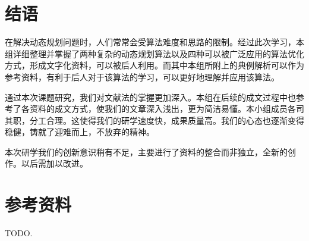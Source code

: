 \begin{Shaded}
\begin{Highlighting}[]
\OperatorTok{(}\OperatorTok{,}\OperatorTok{,}\OperatorTok{(}\OperatorTok{));}\OperatorTok{[}\OperatorTok{]=}\OperatorTok{;}
\OperatorTok{(}\OperatorTok{,}\OperatorTok{);}
\OperatorTok{\textless{}\textless{}}\OperatorTok{[}\OperatorTok{]\textless{}\textless{}}\CharTok{\textquotesingle{}}\CharTok{\textquotesingle{}}\OperatorTok{;}
     \OperatorTok{;}
\OperatorTok{\}}
\end{Highlighting}
\end{Shaded}

\section{结语}

在解决动态规划问题时，人们常常会受算法难度和思路的限制。经过此次学习，本组详细整理并掌握了两种复杂的动态规划算法以及四种可以被广泛应用的算法优化方式，形成文字化资料，可以被后人利用。而其中本组所附上的典例解析可以作为参考资料，有利于后人对于该算法的学习，可以更好地理解并应用该算法。

通过本次课题研究，我们对文献法的掌握更加深入。本组在后续的成文过程中也参考了各资料的成文方式，使我们的文章深入浅出，更为简洁易懂。本小组成员各司其职，分工合理。这使得我们的研学速度快，成果质量高。我们的心态也逐渐变得稳健，铸就了迎难而上，不放弃的精神。

本次研学我们的创新意识稍有不足，主要进行了资料的整合而非独立，全新的创作。以后需加以改进。

\section{参考资料}

TODO.
